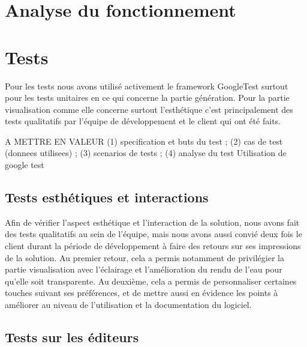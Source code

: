 \documentclass[a4paper]{article}
\begin{document}
\newpage 
\section{Analyse du fonctionnement}

\newpage 
\section{Tests}

Pour les tests nous avons utilisé activement le framework GoogleTest surtout pour les tests unitaires en ce qui concerne la partie génération. 
Pour la partie visualisation comme elle concerne surtout l'esthétique c'est principalement des tests qualitatifs par l'équipe de développement et le client qui ont été faits.

 A METTRE EN VALEUR
 (1) specification et buts du test ; (2) cas de test (donnees utilisees) ; (3) scenarios de tests ; (4) analyse du test
Utilisation de google test

\subsection{Tests esthétiques et interactions}

Afin de vérifier l'aspect esthétique et l'interaction de la solution, nous avons fait des tests qualitatifs au sein de l'équipe, mais nous avons aussi convié deux fois le client durant la période de développement à faire des retours sur ses impressions de la solution.
Au premier retour, cela a permis notamment de privilégier la partie visualisation avec l'éclairage et l'amélioration du rendu de l'eau pour qu'elle soit transparente. 
Au deuxième, cela a permis de personnaliser certaines touches suivant ses préférences, et de mettre aussi en évidence les points à améliorer au niveau de l'utilisation et la documentation du logiciel.

\subsection{Tests sur les éditeurs}
\end{document}
